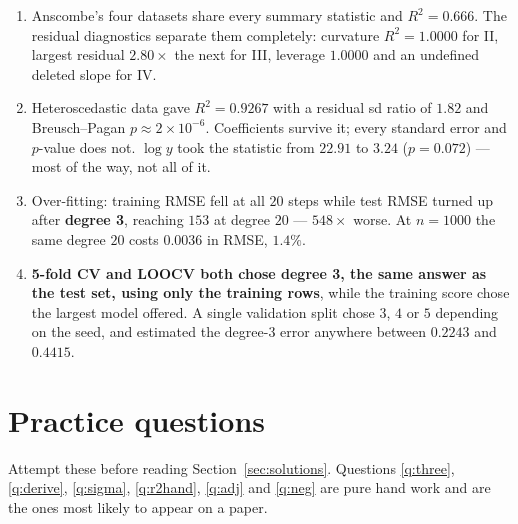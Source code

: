 \documentclass[11pt]{article}
\begin{document}
\begin{enumerate}[leftmargin=*]
    hand, $-1.106$ for a degree-14 fit, $-22.04$ for a degree-3 polynomial on
    diabetes against $-0.0001$ for predicting the mean.
  \item Anscombe's four datasets share every summary statistic and
    $R^2 = 0.666$. The residual diagnostics separate them completely:
    curvature $R^2 = 1.0000$ for II, largest residual $2.80\times$ the next for
    III, leverage $1.0000$ and an undefined deleted slope for IV.
  \item Heteroscedastic data gave $R^2 = 0.9267$ with a residual sd ratio of
    $1.82$ and Breusch--Pagan $p \approx 2\times10^{-6}$. Coefficients survive
    it; every standard error and $p$-value does not. $\log y$ took the
    statistic from $22.91$ to $3.24$ ($p = 0.072$) --- most of the way, not all
    of it.
  \item Over-fitting: training RMSE fell at all $20$ steps while test RMSE
    turned up after \textbf{degree 3}, reaching $153$ at degree $20$ ---
    $548\times$ worse. At $n = 1000$ the same degree $20$ costs $0.0036$ in
    RMSE, $1.4\%$.
  \item \textbf{5-fold CV and LOOCV both chose degree 3, the same answer as
    the test set, using only the training rows}, while the training score
    chose the largest model offered. A single validation split chose $3$, $4$
    or $5$ depending on the seed, and estimated the degree-3 error anywhere
    between $0.2243$ and $0.4415$.
\end{enumerate}

\section{Practice questions}
\label{sec:questions}

Attempt these before reading Section~\ref{sec:solutions}. Questions
\ref{q:three}, \ref{q:derive}, \ref{q:sigma}, \ref{q:r2hand}, \ref{q:adj} and
\ref{q:neg} are pure hand work and are the ones most likely to appear on a
paper.
\end{document}
